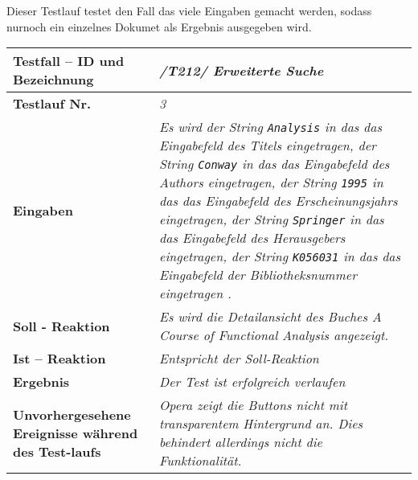 Dieser Testlauf testet den Fall das viele Eingaben gemacht werden, sodass
nurnoch ein einzelnes Dokumet als Ergebnis ausgegeben wird.

\begin{longtable}{|p{5cm}|p{10cm}|}
\hline
\textbf{Testfall -- ID und Bezeichnung} & \textit{/T212/ Erweiterte
Suche} \\
\hline
\textbf{Testlauf Nr.} & \textit{3} \\
\hline
\textbf{Eingaben} & \textit{Es wird 
der String \lstinline{Analysis} in das das Eingabefeld des Titels eingetragen,
der String \lstinline{Conway} in das das Eingabefeld des Authors eingetragen,
der String \lstinline{1995} in das das Eingabefeld des Erscheinungsjahrs
eingetragen,
der String \lstinline{Springer} in das das Eingabefeld des Herausgebers
eingetragen,
der String \lstinline{K056031} in das das Eingabefeld der Bibliotheksnummer eingetragen
.} \\
\hline
\textbf{Soll - Reaktion} & \textit{Es wird die Detailansicht des Buches \emph{A
Course of Functional Analysis} angezeigt.} \\
\hline
\textbf{Ist -- Reaktion} & \textit{Entspricht der Soll-Reaktion} \\
\hline
\textbf{Ergebnis} & \textit{Der Test ist erfolgreich verlaufen} \\
\hline
\textbf{Unvorhergesehene Ereignisse w\"ahrend des Test-laufs } &
\textit{Opera zeigt die Buttons nicht mit transparentem Hintergrund an. Dies
behindert allerdings nicht die Funktionalität.} \\
\hline
\end{longtable}
